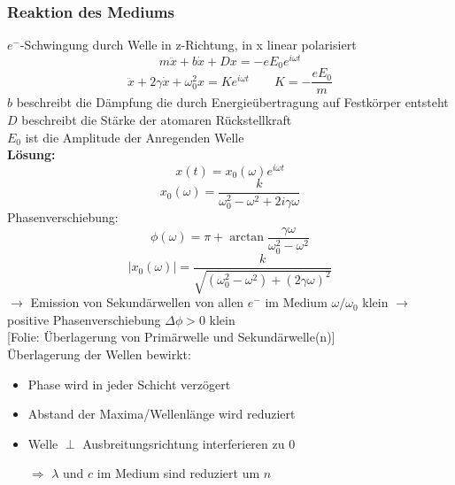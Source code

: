 \documentclass[titlepage,12pt,a4paper,ngerman]{report}
\newcommand{\folie}[1]{\color{gray}[Folie: #1]\color{black}}
\begin{document}
\subsubsection{Reaktion des Mediums}
$ e^- $-Schwingung durch Welle in z-Richtung, in x linear polarisiert
$$m \ddot{x} + b \dot{x} + Dx = - e E_0 e^{i\omega t} $$
$$\ddot{x} + 2 \gamma \dot{x} + \omega_0^2 x = K e ^{i \omega t} \qquad K = - \frac{e E_0}{m}$$
$ b $ beschreibt die Dämpfung die durch Energieübertragung auf Festkörper entsteht\\
$ D $ beschreibt die Stärke der atomaren Rückstellkraft\\
$ E_0 $ ist die Amplitude der Anregenden Welle\\[10pt]
\textbf{Lösung:}
$$x(t) = x_0(\omega) e ^{i \omega t} $$
$$x_0(\omega) = \frac{k}{\omega_0^2  - \omega^2 + 2 i \gamma \omega}$$
Phasenverschiebung: 
$$\phi(\omega) = \pi + \arctan \frac{\gamma \omega}{\omega_0^2 - \omega^2}$$
$$|x_0(\omega)| = \frac{k}{\sqrt{(\omega_0^2 - \omega^2) + (2 \gamma \omega)^2}}$$
$ \rightarrow $ Emission von Sekundärwellen von allen $ e^- $ im Medium $ \omega/ \omega_0  $ klein $ \rightarrow $ positive Phasenverschiebung $ \Delta \phi > 0 $ klein\\
\folie{Überlagerung von Primärwelle und Sekundärwelle(n)}\\[5pt]
Überlagerung der Wellen bewirkt:
\begin{itemize}
	\item Phase wird in jeder Schicht verzögert
	\item Abstand der Maxima/Wellenlänge wird reduziert
	\item Welle $ \perp $ Ausbreitungsrichtung interferieren zu $ 0 $
	\item[$ \Rightarrow $] $ \lambda $ und $ c $ im Medium sind reduziert um $ n $
\end{itemize}
\end{document}
